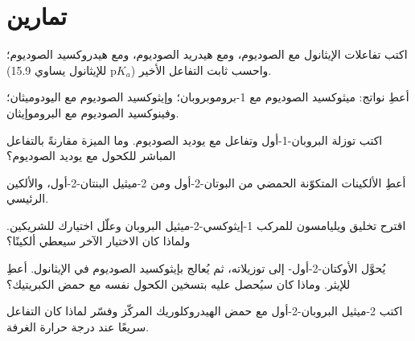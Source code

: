 \section{تمارين}

\begin{exercise}[$\star$]\label{exo:b1:alcohol-activation:1}
اكتب تفاعلات الإيثانول مع الصوديوم، ومع هيدريد الصوديوم، ومع
هيدروكسيد الصوديوم؛ واحسب ثابت التفاعل الأخير ($\mathrm{p}K_a$
للإيثانول يساوي 15.9).
\end{exercise}

\begin{exercise}[$\star$]\label{exo:b1:alcohol-activation:2}
أعطِ نواتج: ميثوكسيد الصوديوم مع 1-بروموبروبان؛ وإيثوكسيد
الصوديوم مع اليودوميثان؛ وفينوكسيد الصوديوم مع البروموإيثان.
\end{exercise}

\begin{exercise}[$\star$]\label{exo:b1:alcohol-activation:3}
اكتب توزلة البروبان-1-أول وتفاعل  مع
يوديد الصوديوم. وما الميزة مقارنةً بالتفاعل المباشر
للكحول مع يوديد الصوديوم؟
\end{exercise}

\begin{exercise}[$\star$]\label{exo:b1:alcohol-activation:4}
أعطِ الألكينات المتكوّنة  الحمضي من البوتان-2-أول ومن
2-ميثيل البنتان-2-أول، والألكين الرئيسي.
\end{exercise}

\begin{exercise}[$\star\star$]\label{exo:b1:alcohol-activation:5}
اقترح تخليق ويليامسون للمركب 1-إيثوكسي-2-ميثيل البروبان وعلّل
اختيارك للشريكين. ولماذا كان الاختيار الآخر سيعطي ألكينًا؟
\end{exercise}

\begin{exercise}[$\star\star$]\label{exo:b1:alcohol-activation:6}
يُحوَّل الأوكتان-2-أول- إلى توزيلاته، ثم يُعالج بإيثوكسيد
الصوديوم في الإيثانول. أعطِ  للإيثر. وماذا
كان سيُحصل عليه بتسخين الكحول نفسه مع حمض الكبريتيك؟
\end{exercise}

\begin{exercise}[$\star\star$]\label{exo:b1:alcohol-activation:7}
اكتب  2-ميثيل البروبان-2-أول مع
حمض الهيدروكلوريك المركّز وفسّر لماذا كان التفاعل سريعًا عند
درجة حرارة الغرفة.
\end{exercise}

